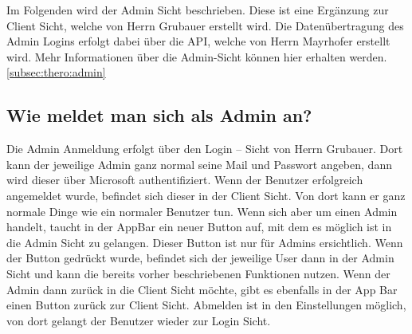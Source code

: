  \label{sec:admin}
Im Folgenden wird der Admin Sicht beschrieben. Diese ist eine Ergänzung zur Client Sicht, welche von Herrn Grubauer erstellt wird. Die Datenübertragung des Admin Logins erfolgt dabei über die API, welche von Herrn Mayrhofer erstellt wird. Mehr Informationen über die Admin-Sicht können hier erhalten werden. \ref{subsec:thero:admin}

\newpage

\subsection{Wie meldet man sich als Admin an?}
Die Admin Anmeldung erfolgt über den Login – Sicht von Herrn Grubauer. Dort kann der jeweilige Admin ganz normal seine Mail und Passwort angeben, dann wird dieser über Microsoft authentifiziert. Wenn der Benutzer erfolgreich angemeldet wurde, befindet sich dieser in der Client Sicht. Von dort kann er ganz normale Dinge wie ein normaler Benutzer tun. Wenn sich aber um einen Admin handelt, taucht in der AppBar ein neuer Button auf, mit dem es möglich ist in die Admin Sicht zu gelangen. Dieser Button ist nur für Admins ersichtlich. Wenn der Button gedrückt wurde, befindet sich der jeweilige User dann in der Admin Sicht und kann die bereits vorher beschriebenen Funktionen nutzen. Wenn der Admin dann zurück in die Client Sicht möchte, gibt es ebenfalls in der App Bar einen Button zurück zur Client Sicht. Abmelden ist in den Einstellungen möglich, von dort gelangt der Benutzer wieder zur Login Sicht.

